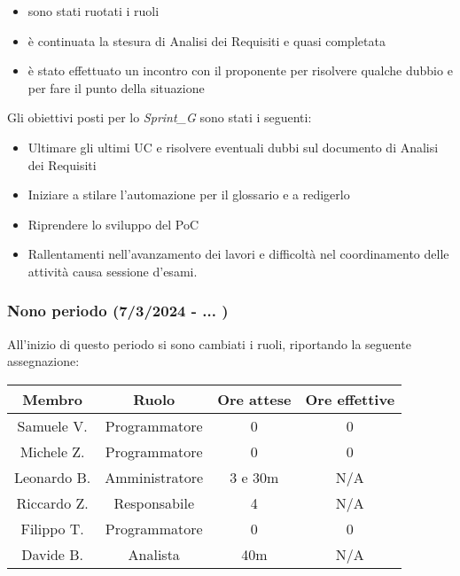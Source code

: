 \begin{itemize}
    \item sono stati ruotati i ruoli
    \item è continuata la stesura di Analisi dei Requisiti e quasi completata
    \item è stato effettuato un incontro con il proponente per risolvere qualche dubbio e per fare il punto della situazione
\end{itemize}

Gli obiettivi posti per lo \textit{Sprint_G} sono stati i seguenti:
\begin{itemize}
    \item Ultimare gli ultimi UC e risolvere eventuali dubbi sul documento di Analisi dei Requisiti
    \item Iniziare a stilare l'automazione per il glossario e a redigerlo
    \item Riprendere lo sviluppo del PoC
\end{itemize}

\begin{itemize}
    \item Rallentamenti nell'avanzamento dei lavori e difficoltà nel coordinamento delle attività causa sessione d'esami.
\end{itemize}


\subsubsection{Nono periodo (7/3/2024 - ... )}
All'inizio di questo periodo si sono cambiati i ruoli, riportando la seguente assegnazione:

\vspace{10 mm}
\begin{tabular}{|c|c|c|c|}
\hline
\textbf{Membro} & \textbf{Ruolo} & \textbf{Ore attese} & \textbf{Ore effettive} \\
\hline
Samuele V. & Programmatore & 0 & 0 \\
\hline
Michele Z. & Programmatore & 0 & 0 \\
\hline
Leonardo B. & Amministratore & 3 e 30m & N/A \\
\hline
Riccardo Z. & Responsabile & 4 & N/A \\
\hline
Filippo T. & Programmatore & 0 & 0 \\
\hline
Davide B. & Analista & 40m & N/A \\
\hline
\end{tabular}
\vspace{10 mm}

